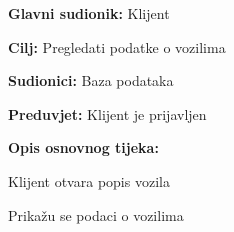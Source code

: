 \noindent {}
\begin{packed_item}
	
	\item \textbf{Glavni sudionik:} Klijent
	\item \textbf{Cilj:} Pregledati podatke o vozilima
	\item \textbf{Sudionici:} Baza podataka
	\item \textbf{Preduvjet:} Klijent je prijavljen
	\item \textbf{Opis osnovnog tijeka:}
	
	\item[] \begin{packed_enum}
		
		\item Klijent otvara popis vozila
		\item Prikažu se podaci o vozilima
	
	\end{packed_enum}
\end{packed_item}

